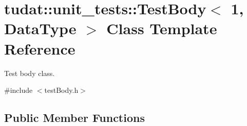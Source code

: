 \hypertarget{classtudat_1_1unit__tests_1_1TestBody_3_011_00_01DataType_01_4}{}\section{tudat\+:\+:unit\+\_\+tests\+:\+:Test\+Body$<$ 1, Data\+Type $>$ Class Template Reference}
\label{classtudat_1_1unit__tests_1_1TestBody_3_011_00_01DataType_01_4}


Test body class.  




{\ttfamily \#include $<$test\+Body.\+h$>$}

\subsection*{Public Member Functions}
